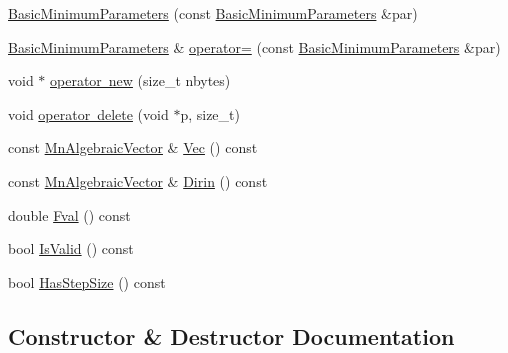 \begin{DoxyCompactItemize}
\mbox{\hyperlink{classROOT_1_1Minuit2_1_1BasicMinimumParameters_a8714fc623b46e7f891748583ff7746b9}{Basic\+Minimum\+Parameters}} (const \mbox{\hyperlink{classROOT_1_1Minuit2_1_1BasicMinimumParameters}{Basic\+Minimum\+Parameters}} \&par)
\item 
\mbox{\hyperlink{classROOT_1_1Minuit2_1_1BasicMinimumParameters}{Basic\+Minimum\+Parameters}} \& \mbox{\hyperlink{classROOT_1_1Minuit2_1_1BasicMinimumParameters_a468d3eefd1f7080b499f090afdb3eab4}{operator=}} (const \mbox{\hyperlink{classROOT_1_1Minuit2_1_1BasicMinimumParameters}{Basic\+Minimum\+Parameters}} \&par)
\item 
void $\ast$ \mbox{\hyperlink{classROOT_1_1Minuit2_1_1BasicMinimumParameters_a5258a9959c0b6ff699a9200dad4caee0}{operator new}} (size\+\_\+t nbytes)
\item 
void \mbox{\hyperlink{classROOT_1_1Minuit2_1_1BasicMinimumParameters_aaaef6d3167e6f4a88182d6f171641fb9}{operator delete}} (void $\ast$p, size\+\_\+t)
\item 
const \mbox{\hyperlink{namespaceROOT_1_1Minuit2_a62ed97730a1ca8d3fbaec64a19aa11c9}{Mn\+Algebraic\+Vector}} \& \mbox{\hyperlink{classROOT_1_1Minuit2_1_1BasicMinimumParameters_ae8dc429aa9491e545efd916d4f72f8dd}{Vec}} () const
\item 
const \mbox{\hyperlink{namespaceROOT_1_1Minuit2_a62ed97730a1ca8d3fbaec64a19aa11c9}{Mn\+Algebraic\+Vector}} \& \mbox{\hyperlink{classROOT_1_1Minuit2_1_1BasicMinimumParameters_a4a4abef44e633bce699eb280228702e1}{Dirin}} () const
\item 
double \mbox{\hyperlink{classROOT_1_1Minuit2_1_1BasicMinimumParameters_a5d92e23ec6117dd29e3e7e2b62ebaf16}{Fval}} () const
\item 
bool \mbox{\hyperlink{classROOT_1_1Minuit2_1_1BasicMinimumParameters_a095b6bfb0949e1d64ef40a94c5d605d6}{Is\+Valid}} () const
\item 
bool \mbox{\hyperlink{classROOT_1_1Minuit2_1_1BasicMinimumParameters_a482374735681f4f24417e7cd1af044df}{Has\+Step\+Size}} () const
\end{DoxyCompactItemize}


\subsection{Constructor \& Destructor Documentation}
\mbox{\label{classROOT_1_1Minuit2_1_1BasicMinimumParameters_ac3a8db51a43b7f99f9e71dcfb9ca9009}} 
